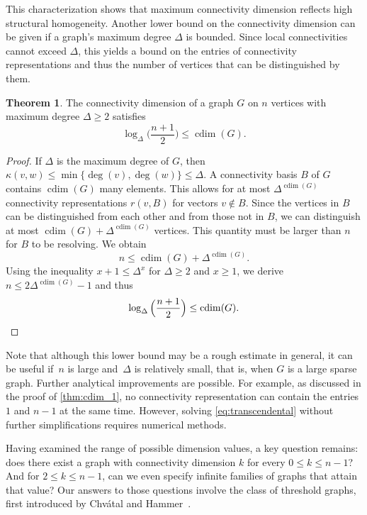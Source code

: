 \documentclass[letterpaper,12pt,headings=normal,parskip=half]{scrartcl}
\DeclareMathOperator{\cdim}{cdim}
\theoremstyle{definition}
\newtheorem{theorem}{Theorem}
\begin{document}
This characterization shows that maximum connectivity dimension reflects high structural homogeneity. 
Another lower bound on the connectivity dimension can be given if a graph's maximum degree $\Delta$ is bounded. Since local connectivities cannot exceed $\Delta$, this yields a bound on the entries of connectivity representations and thus the number of vertices that can be distinguished by them.

\begin{theorem}\label{thm:cdimDelta}
The connectivity dimension of a graph $G$ on $n$ vertices with maximum degree $\Delta\geq 2$ satisfies
\begin{equation*}
    \log_\Delta \Big(\frac{n+1}{2}\Big)\leq\cdim(G).
\end{equation*}
\begin{proof}
If $\Delta$ is the maximum degree of $G$, then ${{\kappa(v,w)\leq\min\{\deg(v),\deg(w)\}\leq \Delta}}$. 
A connectivity basis $B$ of $G$ contains $\cdim(G)$ many elements. 
This allows for at most $\Delta^{\cdim(G)}$ connectivity representations $r(v,B)$ for vectors ${{v\notin B}}$. 
Since the vertices in $B$ can be distinguished from each other and from those not in $B$, we can distinguish at most $\cdim(G) + \Delta^{\cdim(G)}$ vertices. This quantity must be larger than $n$ for $B$ to be resolving. We obtain
\begin{equation}\label{eq:transcendental}
    n\leq \cdim(G) + \Delta^{\cdim(G)}.
\end{equation}
Using the inequality $x+1\leq \Delta^x$ for $\Delta\geq 2$ and $x\geq 1$, we derive $n\leq 2\Delta^{\cdim(G)}-1$ and thus
\begin{equation*}
    \log_\Delta \Big(\frac{n+1}{2}\Big)\leq \cdim(G). \qedhere
\end{equation*}
\end{proof}
\end{theorem}

Note that although this lower bound may be a rough estimate in general, it can be useful if~$n$ is large and~$\Delta$ is relatively small, that is, when $G$ is a large sparse graph. 
Further analytical improvements are possible.
For example, as discussed in the proof of \cref{thm:cdim_1}, no connectivity representation can contain the entries $1$ and $n-1$ at the same time.
However, solving \cref{eq:transcendental} without further simplifications requires numerical methods.

Having examined the range of possible dimension values, a key question remains:
does there exist a graph with connectivity dimension $k$ for every $0\leq k\leq n-1$?
And for $2\leq k\leq n-1$, can we even specify infinite families of graphs that attain that value?
Our answers to those questions involve the class of threshold graphs, first introduced by Chv{\'a}tal and Hammer~\cite{chvatal1977aggregations}.
\end{document}
